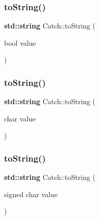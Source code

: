 \mbox{\label{namespace_catch_a5d3bdb2ec0e6f415e2a1a0e4914d7d3a}} 
\subsubsection{\texorpdfstring{to\+String()}{toString()}\hspace{0.1cm}{\footnotesize\ttfamily [13/17]}}
{\footnotesize\ttfamily \textbf{ std\+::string} Catch\+::to\+String (\begin{DoxyParamCaption}\item[{bool}]{value }\end{DoxyParamCaption})}

\mbox{\label{namespace_catch_a25a0a78cbb62ea08b5d49e443051c387}} 
\subsubsection{\texorpdfstring{to\+String()}{toString()}\hspace{0.1cm}{\footnotesize\ttfamily [14/17]}}
{\footnotesize\ttfamily \textbf{ std\+::string} Catch\+::to\+String (\begin{DoxyParamCaption}\item[{char}]{value }\end{DoxyParamCaption})}

\mbox{\label{namespace_catch_a0a5d9d0965d0d2a0663773732283713e}} 
\subsubsection{\texorpdfstring{to\+String()}{toString()}\hspace{0.1cm}{\footnotesize\ttfamily [15/17]}}
{\footnotesize\ttfamily \textbf{ std\+::string} Catch\+::to\+String (\begin{DoxyParamCaption}\item[{signed char}]{value }\end{DoxyParamCaption})}

\mbox{\label{namespace_catch_a5d83eaeb68579a556c86cc05f7a7765f}} 
